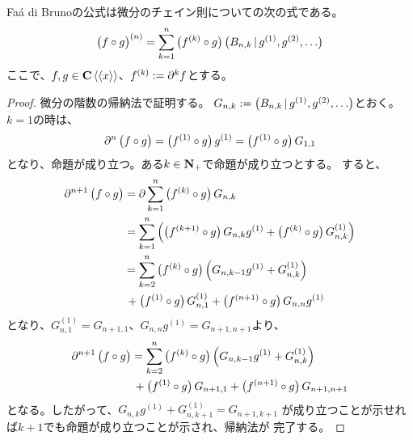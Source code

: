 {	Fa\'a di Brunoの公式は微分のチェイン則についての次の式である。
	\begin{equation*}\begin{split}
		\mathinner{\bigl({f\circ g}\bigr)}^{(n)} = \sum_{k=1}^n 
		\mathinner{\bigl({f^{(k)}\circ g}\bigr)}\mathinner{\bigl({B_{n,k}\,\vert\,g^{(1)},g^{(2)},\dots}\bigr)}
	\end{split}\end{equation*}
	ここで、$f,g\in\mathbf{C}\mathinner{{\langle\langle}{{x}{\rangle\rangle}}}$、$f^{(k)}:={\partial}^k f$とする。
	\begin{proof} %
		微分の階数の帰納法で証明する。
		$G_{n,k}:=\mathinner{\bigl({B_{n,k}\,\vert\,g^{(1)},g^{(2)},\dots}\bigr)}$とおく。
		$k=1$の時は、
		\begin{equation*}\begin{split}
			{\partial}^n\mathinner{\bigl({f\circ g}\bigr)} = \mathinner{\bigl({f^{(1)}\circ g}\bigr)}g^{(1)}
			= \mathinner{\bigl({f^{(1)}\circ g}\bigr)}G_{1,1}
		\end{split}\end{equation*}
		となり、命題が成り立つ。ある$k\in\mathbf{N}_+$で命題が成り立つとする。
		すると、
		\begin{equation*}\begin{split}
			{\partial}^{n+1}\mathinner{\bigl({f\circ g}\bigr)} &= {\partial} \sum_{k=1}^n
				\mathinner{\bigl({f^{(k)}\circ g}\bigr)}G_{n,k} \\
			&= \sum_{k=1}^n\mathinner{\Bigl({\mathinner{\bigl({f^{(k+1)}\circ g}\bigr)}G_{n,k}g^{(1)}
				+ \mathinner{\bigl({f^{(k)}\circ g}\bigr)}G_{n,k}^{(1)}}\Bigr)} \\
			&= \sum_{k=2}^n \mathinner{\bigl({f^{(k)}\circ g}\bigr)}
				\mathinner{\Bigl({G_{n,k-1}g^{(1)} + G_{n,k}^{(1)}}\Bigr)} \\
			&\,+ \mathinner{\bigl({f^{(1)}\circ g}\bigr)}G_{n,1}^{(1)}
				+ \mathinner{\bigl({f^{(n+1)}\circ g}\bigr)}G_{n,n}g^{(1)}
		\end{split}\end{equation*}
		となり、$G_{n,1}^{(1)}=G_{n+1,1}$、$G_{n,n}g^{(1)}=G_{n+1,n+1}$より、
		\begin{equation*}\begin{split}
			{\partial}^{n+1}\mathinner{\bigl({f\circ g}\bigr)} &= \sum_{k=2}^n \mathinner{\bigl({f^{(k)}\circ g}\bigr)}
				\mathinner{\Bigl({G_{n,k-1}g^{(1)} + G_{n,k}^{(1)}}\Bigr)} \\
			&\,+ \mathinner{\bigl({f^{(1)}\circ g}\bigr)}G_{n+1,1} 
				+ \mathinner{\bigl({f^{(n+1)}\circ g}\bigr)}G_{n+1,n+1}
		\end{split}\end{equation*}
		となる。したがって、$G_{n,k}g^{(1)} + G_{n,k+1}^{(1)} = G_{n+1,k+1}$
		が成り立つことが示せれば$k+1$でも命題が成り立つことが示され、帰納法が
		完了する。
		

\end{proof}}

